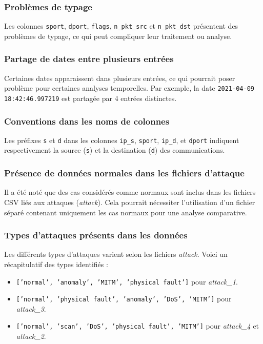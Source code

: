 \subsubsection*{Problèmes de typage}
Les colonnes \texttt{sport}, \texttt{dport}, \texttt{flags}, \texttt{n\_pkt\_src} et \texttt{n\_pkt\_dst} présentent des problèmes de typage, ce qui peut compliquer leur traitement ou analyse.

\subsubsection*{Partage de dates entre plusieurs entrées}
Certaines dates apparaissent dans plusieurs entrées, ce qui pourrait poser problème pour certaines analyses temporelles. Par exemple, la date \texttt{2021-04-09 18:42:46.997219} est partagée par 4 entrées distinctes.

\subsubsection*{Conventions dans les noms de colonnes}
Les préfixes \texttt{s} et \texttt{d} dans les colonnes \texttt{ip\_s}, \texttt{sport}, \texttt{ip\_d}, et \texttt{dport} indiquent respectivement la source (\texttt{s}) et la destination (\texttt{d}) des communications.

\subsubsection*{Présence de données normales dans les fichiers d'attaque}
Il a été noté que des cas considérés comme normaux sont inclus dans les fichiers CSV liés aux attaques (\textit{attack}). Cela pourrait nécessiter l'utilisation d'un fichier séparé contenant uniquement les cas normaux pour une analyse comparative.

\subsubsection*{Types d'attaques présents dans les données}
Les différents types d'attaques varient selon les fichiers \textit{attack}. Voici un récapitulatif des types identifiés :
\begin{itemize}
    \item \texttt{['normal', 'anomaly', 'MITM', 'physical fault']} pour \textit{attack\_1}.
    \item \texttt{['normal', 'physical fault', 'anomaly', 'DoS', 'MITM']} pour \textit{attack\_3}.
    \item \texttt{['normal', 'scan', 'DoS', 'physical fault', 'MITM']} pour \textit{attack\_4} et \textit{attack\_2}.
\end{itemize}



